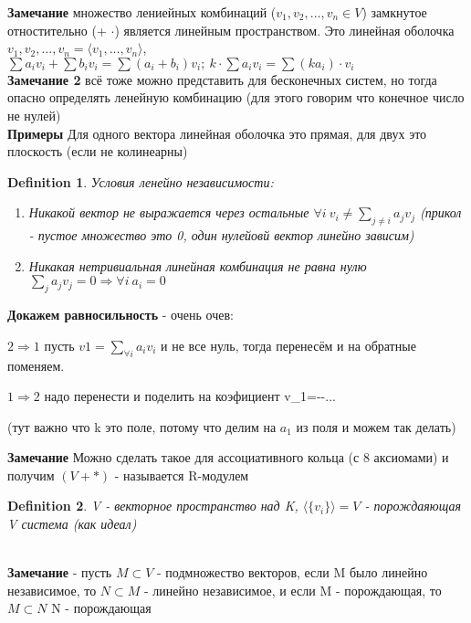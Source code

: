 \documentclass[12pt]{article}
\newtheorem{definition}{Definition}
\begin{document}
\textbf{Замечание} множество лениейных комбинаций ($v_1, v_2, ..., v_n \in V$) замкнутое отностительно (+ $\cdot$)  является линейным пространством. Это линейная оболочка $v_1, v_2, ..., v_n = \langle v_1, ..., v_n \rangle$, $\sum a_iv_i+\sum b_iv_i=\sum (a_i+b_i)v_i;\ k\cdot \sum a_iv_i=\sum (ka_i)\cdot v_i$ \\


\textbf{Замечание 2} всё тоже можно представить для бесконечных систем, но тогда опасно определять ленейную комбинацию (для этого говорим что конечное число не нулей)
\\

\textbf{Примеры} Для одного вектора линейная оболочка это прямая, для двух это плоскость (если не колинеарны) 


\begin{definition}
    Условия ленейно независимости:
    \begin{enumerate}
        \item  Никакой вектор не выражается через остальные $\forall i\ v_i\neq \sum_{j\neq i} {a_jv_j}$
        (прикол - пустое множество это 0, один нулейовй вектор линейно зависим)
        \item Никакая нетривиальная линейная комбинация не равна нулю $\sum_{j} {a_jv_j}=0\Rightarrow \forall i\ a_i=0$
    \end{enumerate}

\end{definition}
 

\textbf{Докажем равносильность} - очень очев: 

$2 \Rightarrow 1$ пусть $v1 = \sum_{\forall i} {a_iv_i}$ и не все нуль, тогда перенесём и на обратные поменяем. 

$1 \Rightarrow 2$ надо перенести и поделить на коэфициент v_1=--... 

(тут важно что k это поле, потому что делим на $a_1$ из поля и можем так делать) 

\textbf{Замечание} Можно сделать такое для ассоциативного кольца (с 8 аксиомами) и получим $(V + *)$ - называется R-модулем

\begin{definition}
    V - векторное пространство над K, $\langle\{v_i\} \rangle =V$ - порождаяющая V система (как идеал)
\end{definition} 
\\

\textbf{Замечание} - пусть $M \subset V$ - подмножество векторов, если M было линейно независимое, то $N \subset M$ - линейно независимое, и если M - порождающая, то $M \subset N$ N - порождающая
\\
\end{document}
